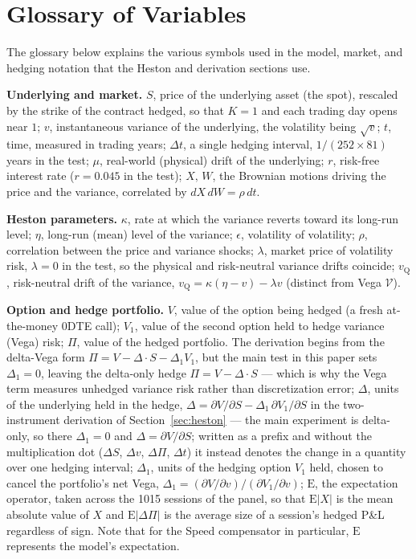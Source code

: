 \documentclass[11pt]{article}
\begin{document}
\section{Glossary of Variables}
The glossary below explains the various symbols used in the model, market, and hedging notation that
the Heston and derivation sections use.\par
\noindent\textbf{Underlying and market.}\quad
$S$, price of the underlying asset (the spot), rescaled by the strike of the contract hedged, so that $K = 1$ and each trading day opens near $1$;
$v$, instantaneous variance of the underlying, the volatility being $\sqrt{v}$;
$t$, time, measured in trading years; $\Delta t$, a single hedging interval, $1/(252 \times 81)$ years in the test;
$\mu$, real-world (physical) drift of the underlying;
$r$, risk-free interest rate ($r = 0.045$ in the test);
$X,\,W$, the Brownian motions driving the price and the variance, correlated by $dX\,dW = \rho\,dt$.\par
\noindent\textbf{Heston parameters.}\quad
$\kappa$, rate at which the variance reverts toward its long-run level;
$\eta$, long-run (mean) level of the variance;
$\epsilon$, volatility of volatility;
$\rho$, correlation between the price and variance shocks;
$\lambda$, market price of volatility risk, $\lambda = 0$ in the test, so the physical and risk-neutral variance drifts coincide;
$v_{\mathrm{Q}}$, risk-neutral drift of the variance, $v_{\mathrm{Q}} = \kappa(\eta - v) - \lambda v$ (distinct from Vega $\mathcal{V}$).\par
\noindent\textbf{Option and hedge portfolio.}\quad
$V$, value of the option being hedged (a fresh at-the-money 0DTE call);
$V_1$, value of the second option held to hedge variance (Vega) risk;
$\Pi$, value of the hedged portfolio. The derivation begins from the delta-Vega form $\Pi = V - \Delta \cdot S - \Delta_1 V_1$, but the main test in this paper sets $\Delta_1 = 0$, leaving the delta-only hedge $\Pi = V - \Delta \cdot S$ --- which is why the Vega term measures unhedged variance risk rather than discretization error;
$\Delta$, units of the underlying held in the hedge, $\Delta = \partial V/\partial S - \Delta_1\,\partial V_1/\partial S$ in the two-instrument derivation of Section~\ref{sec:heston} --- the main experiment is delta-only, so there $\Delta_1 = 0$ and $\Delta = \partial V/\partial S$; written as a prefix and without the multiplication dot ($\Delta S$, $\Delta v$, $\Delta\Pi$, $\Delta t$) it instead denotes the change in a quantity over one hedging interval;
$\Delta_1$, units of the hedging option $V_1$ held, chosen to cancel the portfolio's net Vega, $\Delta_1 = (\partial V/\partial v)\big/(\partial V_1/\partial v)$;
$\mathrm{E}$, the expectation operator, taken across the 1015 sessions of the panel, so that $\mathrm{E}|X|$ is the mean absolute value of $X$ and $\mathrm{E}|\Delta\Pi|$ is the average size of a session's hedged P\&L regardless of sign. Note that for the Speed compensator in particular, $\mathrm{E}$ represents the model's expectation.
\end{document}
